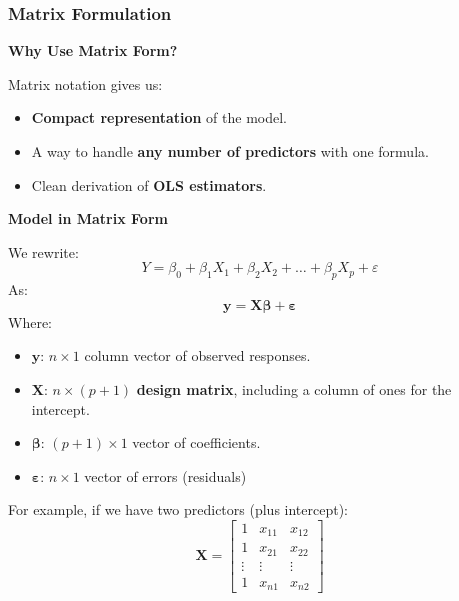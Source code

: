 \subsubsection{Matrix Formulation}\label{subsubsection: Matrix Formulation}

\begin{flushleft}
    \textcolor{Green3}{ \textbf{Why Use Matrix Form?}}
\end{flushleft}
Matrix notation gives us:
\begin{itemize}
    \item \textbf{Compact representation} of the model.
    \item A way to handle \textbf{any number of predictors} with one formula.
    \item Clean derivation of \textbf{OLS estimators}.
\end{itemize}

\highspace
\begin{flushleft}
    \textcolor{Green3}{ \textbf{Model in Matrix Form}}
\end{flushleft}
We rewrite:
\begin{equation*}
    Y = \beta_0 + \beta_1 X_1 + \beta_2 X_2 + \dots + \beta_p X_p + \varepsilon
\end{equation*}
As:
\begin{equation}
    \mathbf{y} = \mathbf{X} \boldsymbol{\beta} + \boldsymbol{\varepsilon}    
\end{equation}
Where:
\begin{itemize}
    \item $\mathbf{y}$: $n \times 1$ column vector of observed responses.
    \item $\mathbf{X}$: $n \times (p+1)$ \textbf{design matrix}, including a column of ones for the intercept.
    \item $\boldsymbol{\beta}$: $(p+1) \times 1$ vector of coefficients.
    \item $\boldsymbol{\varepsilon}$: $n \times 1$ vector of errors (residuals)
\end{itemize}
For example, if we have two predictors (plus intercept):
\begin{equation*}
    \mathbf{X} =
    \begin{bmatrix}
    1 & x_{11} & x_{12} \\
    1 & x_{21} & x_{22} \\
    \vdots & \vdots & \vdots \\
    1 & x_{n1} & x_{n2}
    \end{bmatrix}
\end{equation*}

